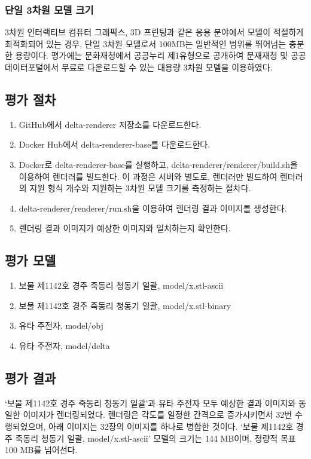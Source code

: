 \documentclass[11pt,oneside,openany,itemph,a4paper,chapter]{oblivoir}
\begin{document}
\subsubsection{단일 3차원 모델 크기}
3차원 인터랙티브 컴퓨터 그래픽스, 3D 프린팅과 같은 응용 분야에서 모델이 적절하게 최적화되어 있는 경우, 단일 3차원 모델로서 100MB는 일반적인 범위를 뛰어넘는 충분한 용량이다. 평가에는 문화재청에서 공공누리 제1유형으로 공개하여 문재재청 및 공공데이터포털에서 무료로 다운로드할 수 있는 대용량 3차원 모델을 이용하였다.

\subsection{평가 절차}
\begin{enumerate}
    \item GitHub에서 delta-renderer 저장소를 다운로드한다.
    \item Docker Hub에서 delta-renderer-base를 다운로드한다.
    \item Docker로 delta-renderer-base를 실행하고, delta-renderer/renderer/build.sh을 이용하여 렌더러를 빌드한다. 이 과정은 서버와 별도로, 렌더러만 빌드하여 렌더러의 지원 형식 개수와 지원하는 3차원 모델 크기를 측정하는 절차다.
    \item delta-renderer/renderer/run.sh을 이용하여 렌더링 결과 이미지를 생성한다.
    \item 렌더링 결과 이미지가 예상한 이미지와 일치하는지 확인한다.
\end{enumerate}

\subsection{평가 모델}
\begin{enumerate}
    \item 보물 제1142호 경주 죽동리 청동기 일괄, model/x.stl-ascii
    \item 보물 제1142호 경주 죽동리 청동기 일괄, model/x.stl-binary
    \item 유타 주전자, model/obj
    \item 유타 주전자, model/delta
\end{enumerate}

\subsection{평가 결과}

`보물 제1142호 경주 죽동리 청동기 일괄'과 유타 주전자 모두 예상한 결과 이미지와 동일한 이미지가 렌더링되었다. 렌더링은 각도를 일정한 간격으로 증가시키면서 32번 수행되었으며, 아래 이미지는 32장의 이미지를 하나로 병합한 것이다. `보물 제1142호 경주 죽동리 청동기 일괄, model/x.stl-ascii' 모델의 크기는 144 MB이며, 정량적 목표 100 MB를 넘어선다.
\end{document}
